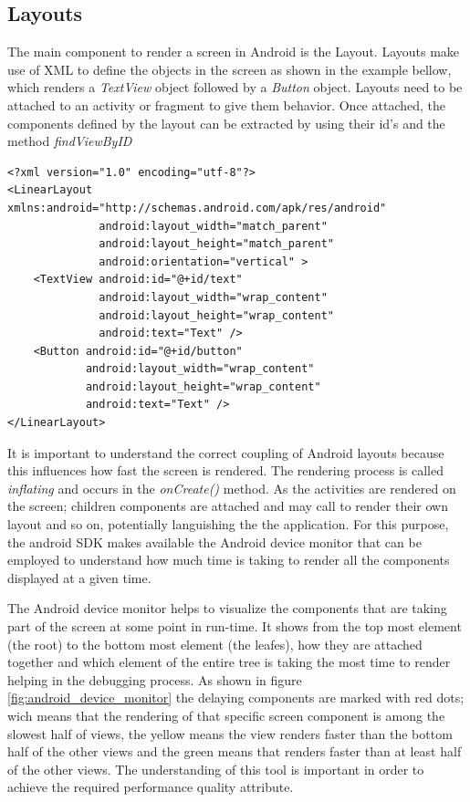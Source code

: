 \subsection{Layouts}
The main component to render a screen in Android is the Layout. Layouts make use of XML to define the objects in the screen as shown in the example bellow, which renders a \textit{TextView} object followed by a \textit{Button} object. Layouts need to be attached to an activity or fragment to give them behavior. Once attached, the components defined by the layout can be extracted by using their id's and the method \textit{findViewByID}

\begin{verbatim}
<?xml version="1.0" encoding="utf-8"?>
<LinearLayout xmlns:android="http://schemas.android.com/apk/res/android"
              android:layout_width="match_parent"
              android:layout_height="match_parent"
              android:orientation="vertical" >
    <TextView android:id="@+id/text"
              android:layout_width="wrap_content"
              android:layout_height="wrap_content"
              android:text="Text" />
    <Button android:id="@+id/button"
            android:layout_width="wrap_content"
            android:layout_height="wrap_content"
            android:text="Text" />
</LinearLayout>
\end{verbatim}

It is important to understand the correct coupling of Android layouts because this influences how fast the screen is rendered. The rendering process is called \textit{inflating} and occurs in the \textit{onCreate()} method. As the activities are rendered on the screen; children components are attached and may call to render their own layout and so on, potentially languishing the the application. For this purpose, the android SDK makes available the Android device monitor that can be employed to understand how much time is taking to render all the components displayed at a given time. 

The Android device monitor helps to visualize the components that are taking part of the screen at some point in run-time. It shows from the top most element (the root) to the bottom most element (the leafes), how they are attached together and which element of the entire tree is taking the most time to render helping in the debugging process. As shown in figure \ref{fig:android_device_monitor} the delaying components are marked with red dots; wich means that the rendering of that specific screen component is among the slowest half of views, the yellow means the view renders faster than the bottom half of the other views and the green means that renders faster than at least half of the other views. The understanding of this tool is important in order to achieve the required performance quality attribute. 

